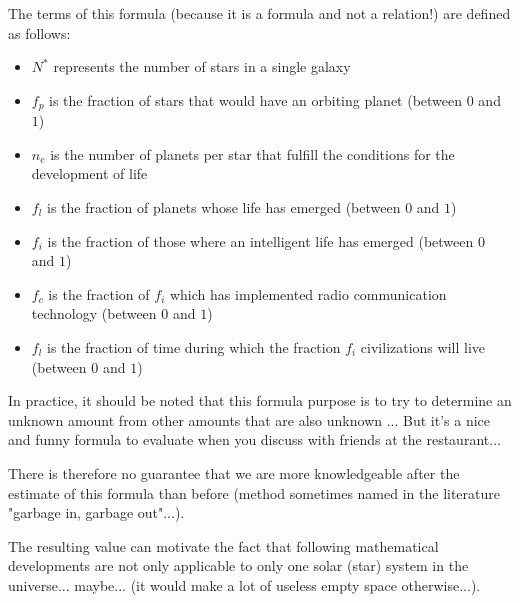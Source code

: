 	The terms of this formula (because it is a formula and not a relation!) are defined as follows:
	\begin{itemize}
		\item $N^{*}$ represents the number of stars in a single galaxy
		\item $f_p$ is the fraction of stars that would have an orbiting planet (between $0$ and $1$)
		\item $n_e$ is the number of planets per star that fulfill the conditions for the development of life
		\item $f_l$ is the fraction of planets whose life has emerged (between $0$ and $1$)
		\item $f_i$ is the fraction of those where an intelligent life has emerged (between $0$ and $1$)
		\item $f_c$ is the fraction of $f_i$ which has implemented radio communication technology (between $0$ and $1$)
		\item $f_l$ is the fraction of time during which the fraction $f_i$ civilizations will live (between $0$ and $1$)
	\end{itemize}
	In practice, it should be noted that this formula purpose is to try to determine an unknown amount from other amounts that are also unknown ... But it's a nice and funny formula to evaluate when you discuss with friends at the restaurant...
	
	There is therefore no guarantee that we are more knowledgeable after the estimate of this formula than before (method sometimes named in the literature "garbage in, garbage out"...).
	
	The resulting value can motivate the fact that following mathematical developments are not only applicable to only one solar (star) system in the universe... maybe... (it would make a lot of useless empty space otherwise...).
	
